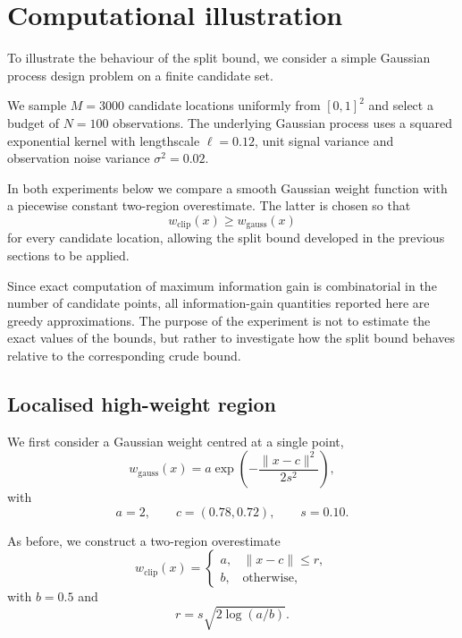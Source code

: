 \section{Computational illustration}

To illustrate the behaviour of the split bound, we consider a simple
Gaussian process design problem on a finite candidate set.

We sample $M=3000$ candidate locations uniformly from $[0,1]^2$
and select a budget of $N=100$ observations.
The underlying Gaussian process uses a squared exponential kernel with
lengthscale $\ell=0.12$, unit signal variance and observation noise
variance $\sigma^2=0.02$.

In both experiments below we compare a smooth Gaussian weight function
with a piecewise constant two-region overestimate. The latter is chosen
so that
\begin{equation*}
w_{\mathrm{clip}}(x)\geq w_{\mathrm{gauss}}(x)
\end{equation*}
for every candidate location, allowing the split bound developed in the
previous sections to be applied.

Since exact computation of maximum information gain is combinatorial in
the number of candidate points, all information-gain quantities reported
here are greedy approximations. The purpose of the experiment is not to
estimate the exact values of the bounds, but rather to investigate how
the split bound behaves relative to the corresponding crude bound.
\subsection{Localised high-weight region}

We first consider a Gaussian weight centred at a single point,
\begin{equation*}
w_{\mathrm{gauss}}(x)
=
a\exp\!\left(
-\frac{\|x-c\|^2}{2s^2}
\right),
\end{equation*}
with
\begin{equation*}
a=2,
\qquad
c=(0.78,0.72),
\qquad
s=0.10.
\end{equation*}

As before, we construct a two-region overestimate
\begin{equation*}
w_{\mathrm{clip}}(x)
=
\begin{cases}
a,& \|x-c\|\le r,\\
b,& \text{otherwise},
\end{cases}
\end{equation*}
with $b=0.5$ and
\begin{equation*}
r=s\sqrt{2\log(a/b)}.
\end{equation*}


